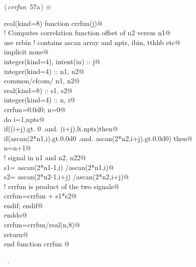 \documentclass[10pt,a4paper,notitlepage]{article}
\begin{document}
\begin{flushleft} \small
\begin{minipage}{\linewidth}\label{scrap61}\raggedright\small
{} $\langle\,${\it crrfun}\nobreak\ {\footnotesize {57a}}$\,\rangle\equiv$
\vspace{-1ex}
\begin{list}{}{} \item
\mbox{}\verb@      real(kind=8) function crrfun(j)@\\
\mbox{}\verb@! Computes correlation function offset of n2 versus n1@\\
\mbox{}\verb@      use rebin ! contains ascan array and npts, ibin, tthhb etc@\\
\mbox{}\verb@      implicit none@\\
\mbox{}\verb@      integer(kind=4), intent(in) :: j@\\
\mbox{}\verb@      integer(kind=4) :: n1, n2@\\
\mbox{}\verb@      common/cfcom/ n1, n2@\\
\mbox{}\verb@      real(kind=8) :: s1, s2@\\
\mbox{}\verb@      integer(kind=4) :: n, i@\\
\mbox{}\verb@      crrfun=0.0d0; n=0@\\
\mbox{}\verb@      do i=1,npts@\\
\mbox{}\verb@        if((i+j).gt. 0 .and. (i+j).lt.npts)then@\\
\mbox{}\verb@        if(ascan(2*n1,i).gt.0.0d0 .and. ascan(2*n2,i+j).gt.0.0d0) then@\\
\mbox{}\verb@          n=n+1@\\
\mbox{}\verb@! signal in n1 and n2, n22@\\
\mbox{}\verb@          s1= ascan(2*n1-1,i)   /ascan(2*n1,i)@\\
\mbox{}\verb@          s2= ascan(2*n2-1,i+j) /ascan(2*n2,i+j)@\\
\mbox{}\verb@! crrfun is product of the two signals@\\
\mbox{}\verb@          crrfun=crrfun + s1*s2@\\
\mbox{}\verb@        endif; endif@\\
\mbox{}\verb@      enddo@\\
\mbox{}\verb@      crrfun=crrfun/real(n,8)@\\
\mbox{}\verb@      return@\\
\mbox{}\verb@      end function crrfun                                                    @{\NWsep}
\end{list}
\vspace{-1.5ex}
\footnotesize
\begin{list}{}{\setlength{\itemsep}{-\parsep}\setlength{\itemindent}{-\leftmargin}}
\item \NWtxtMacroRefIn\ .

\item{}
\end{list}
\end{minipage}\vspace{4ex}
\end{flushleft}
\end{document}
